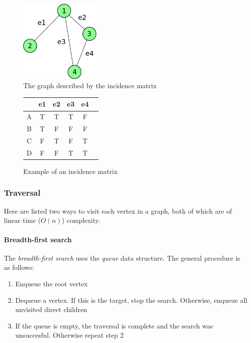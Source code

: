 \documentclass{article}
\begin{document}
{\begin{figure}[H]
  \centering
  \includegraphics[width=4cm]{incidence_graph}
  \caption{The graph described by the incidence matrix}
\end{figure}

\begin{figure}[H]
  \centering
  \begin{tabular}{|c|c|c|c|c|c|}
    \hline
    \  & e1 & e2 & e3 & e4 \\ [0.5ex]
    \hline
    A  & T  & T  & T  & F  \\ 
    \hline
    B  & T  & F  & F  & F  \\
    \hline
    C  & F  & T  & F  & T  \\
    \hline
    D  & F  & F  & T  & T  \\
    \hline
  \end{tabular}
  \caption{Example of an incidence matrix}
\end{figure}


\subsubsection{Traversal}
Here are listed two ways to visit each vertex in a graph,
both of which are of linear time (\(O(n)\)) complexity.

\paragraph{Breadth-first search}
The {\em breadth-first search} uses the {\em queue} data structure. The general procedure is as follows:
\begin{enumerate}
\item{Enqueue the root vertex}
\item{Dequeue a vertex. If this is the target, stop the search. Otherwise, enqueue all unvisited direct children}
\item{If the queue is empty, the traversal is complete and the search was unsuccesful. Otherwise repeat step 2}
\end{enumerate}

}
\end{document}
